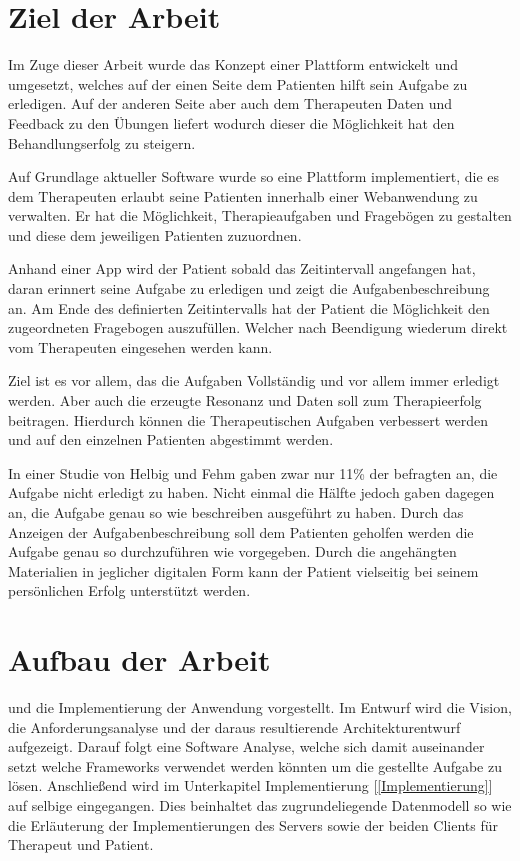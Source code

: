 \section{Ziel der Arbeit}

Im Zuge dieser Arbeit wurde das Konzept einer Plattform entwickelt und umgesetzt, welches auf der einen Seite dem Patienten hilft sein Aufgabe zu erledigen. Auf der anderen Seite aber auch dem Therapeuten Daten und Feedback zu den Übungen liefert wodurch dieser die Möglichkeit hat den Behandlungserfolg zu steigern.

Auf Grundlage aktueller Software wurde so eine Plattform implementiert, die es dem Therapeuten erlaubt seine Patienten innerhalb einer Webanwendung zu verwalten. Er hat die Möglichkeit, Therapieaufgaben und Fragebögen zu gestalten und diese dem jeweiligen Patienten zuzuordnen.

Anhand einer App wird der Patient sobald das Zeitintervall angefangen hat, daran erinnert seine Aufgabe zu erledigen und zeigt die Aufgabenbeschreibung an. Am Ende des definierten Zeitintervalls hat der Patient die Möglichkeit den zugeordneten Fragebogen auszufüllen. Welcher nach Beendigung wiederum direkt vom Therapeuten eingesehen werden kann.

Ziel ist es vor allem, das die Aufgaben Vollständig und vor allem immer erledigt werden. Aber auch die erzeugte Resonanz und Daten soll zum Therapieerfolg beitragen. Hierdurch können die Therapeutischen Aufgaben verbessert werden und auf den einzelnen Patienten abgestimmt werden.

In einer Studie von Helbig und Fehm \cite{bibid} gaben zwar nur 11\% der befragten an, die Aufgabe nicht erledigt zu haben. Nicht einmal die Hälfte jedoch gaben dagegen an, die Aufgabe genau so wie beschreiben ausgeführt zu haben. Durch das Anzeigen der Aufgabenbeschreibung soll dem Patienten geholfen werden die Aufgabe genau so durchzuführen wie vorgegeben. Durch die angehängten Materialien in jeglicher digitalen Form kann der Patient vielseitig bei seinem persönlichen Erfolg unterstützt werden.

\section{Aufbau der Arbeit}

 und die Implementierung der Anwendung vorgestellt. Im Entwurf wird die Vision, die Anforderungsanalyse und der daraus resultierende Architekturentwurf aufgezeigt. Darauf folgt eine Software Analyse, welche sich damit auseinander setzt welche Frameworks verwendet werden könnten um die gestellte Aufgabe zu lösen. Anschließend wird im Unterkapitel Implementierung [\ref*{Implementierung}] auf selbige eingegangen. Dies beinhaltet das zugrundeliegende Datenmodell so wie die Erläuterung der Implementierungen des Servers sowie der beiden Clients für Therapeut und Patient.
